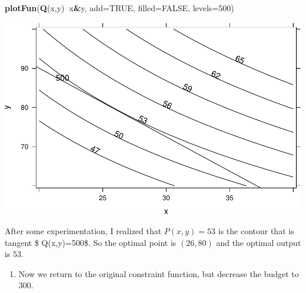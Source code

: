 \documentclass[
]{book}
\newenvironment{Shaded}{\begin{snugshade}}{\end{snugshade}}
\newcommand{\DataTypeTok}[1]{\textcolor[rgb]{0.13,0.29,0.53}{#1}}
\newcommand{\DecValTok}[1]{\textcolor[rgb]{0.00,0.00,0.81}{#1}}
\newcommand{\KeywordTok}[1]{\textcolor[rgb]{0.13,0.29,0.53}{\textbf{#1}}}
\newcommand{\NormalTok}[1]{#1}
\newcommand{\OperatorTok}[1]{\textcolor[rgb]{0.81,0.36,0.00}{\textbf{#1}}}
\newcommand{\OtherTok}[1]{\textcolor[rgb]{0.56,0.35,0.01}{#1}}
\providecommand{\tightlist}{%
  \setlength{\itemsep}{0pt}\setlength{\parskip}{0pt}}
\begin{document}
\begin{Shaded}
\begin{Highlighting}[]
\KeywordTok{plotFun}\NormalTok{(}\KeywordTok{Q}\NormalTok{(x,y)}\OperatorTok{~}\NormalTok{x}\OperatorTok{&}\NormalTok{y, }\DataTypeTok{add=}\OtherTok{TRUE}\NormalTok{, }\DataTypeTok{filled=}\OtherTok{FALSE}\NormalTok{, }\DataTypeTok{levels=}\DecValTok{500}\NormalTok{)}
\end{Highlighting}
\end{Shaded}

\includegraphics{_bookdown_files/math135_handbook_files/figure-latex/unnamed-chunk-116-1.pdf}

After some experimentation, I realized that \(P(x,y)=53\) is the contour that is tangent \$ Q(x,y)=500\$. So the optimal point is \((26,80)\) and the optimal output is 53.

\begin{enumerate}
\def\labelenumi{\arabic{enumi}.}
\setcounter{enumi}{2}
\tightlist
\item
  Now we return to the original constraint function, but decrease the budget to \(300\).
\end{enumerate}
\end{document}
